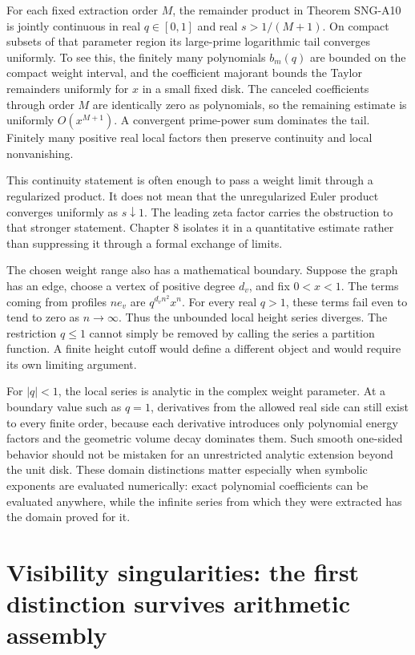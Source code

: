 \documentclass[
  11pt,
  a4paper,
]{report}
\begin{document}
For each fixed extraction order \(M\), the remainder product in Theorem
SNG-A10 is jointly continuous in real \(q\in[0,1]\) and real
\(s>1/(M+1)\). On compact subsets of that parameter region its
large-prime logarithmic tail converges uniformly. To see this, the
finitely many polynomials \(b_m(q)\) are bounded on the compact weight
interval, and the coefficient majorant bounds the Taylor remainders
uniformly for \(x\) in a small fixed disk. The canceled coefficients
through order \(M\) are identically zero as polynomials, so the
remaining estimate is uniformly \(O(x^{M+1})\). A convergent prime-power
sum dominates the tail. Finitely many positive real local factors then
preserve continuity and local nonvanishing.

This continuity statement is often enough to pass a weight limit through
a regularized product. It does not mean that the unregularized Euler
product converges uniformly as \(s\downarrow1\). The leading zeta factor
carries the obstruction to that stronger statement. Chapter 8 isolates
it in a quantitative estimate rather than suppressing it through a
formal exchange of limits.

The chosen weight range also has a mathematical boundary. Suppose the
graph has an edge, choose a vertex of positive degree \(d_v\), and fix
\(0<x<1\). The terms coming from profiles \(ne_v\) are
\(q^{d_vn^2}x^n\). For every real \(q>1\), these terms fail even to tend
to zero as \(n\to\infty\). Thus the unbounded local height series
diverges. The restriction \(q\le1\) cannot simply be removed by calling
the series a partition function. A finite height cutoff would define a
different object and would require its own limiting argument.

For \(|q|<1\), the local series is analytic in the complex weight
parameter. At a boundary value such as \(q=1\), derivatives from the
allowed real side can still exist to every finite order, because each
derivative introduces only polynomial energy factors and the geometric
volume decay dominates them. Such smooth one-sided behavior should not
be mistaken for an unrestricted analytic extension beyond the unit disk.
These domain distinctions matter especially when symbolic exponents are
evaluated numerically: exact polynomial coefficients can be evaluated
anywhere, while the infinite series from which they were extracted has
the domain proved for it.

\hypertarget{visibility-singularities-the-first-distinction-survives-arithmetic-assembly}{%
\chapter{Visibility singularities: the first distinction survives
arithmetic
assembly}\label{visibility-singularities-the-first-distinction-survives-arithmetic-assembly}}
\end{document}
